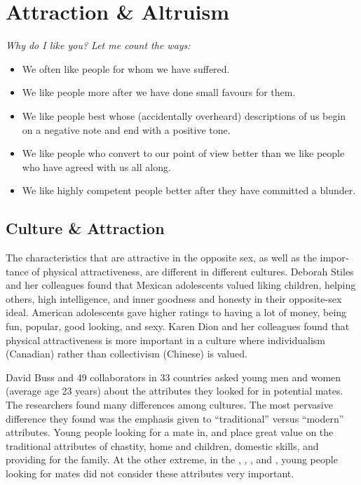 \documentclass[
]{book}
\providecommand{\tightlist}{%
  \setlength{\itemsep}{0pt}\setlength{\parskip}{0pt}}
\begin{document}
\hypertarget{attraction-altruism}{%
\section{Attraction \& Altruism}\label{attraction-altruism}}

\emph{Why do I like you? Let me count the ways:}

\begin{itemize}
\tightlist
\item
  We often like people for whom we have suffered.\\
\item
  We like people more after we have done small favours for them.\\
\item
  We like people best whose (accidentally over­heard) descriptions of us begin on a negative note and end with a posi­tive tone.\\
\item
  We like people who convert to our point of view better than we like people who have agreed with us all along.\\
\item
  We like highly competent people better after they have committed a blunder.
\end{itemize}

\hypertarget{culture-attraction}{%
\subsection*{Culture \& Attraction}\label{culture-attraction}}

The characteristics that are attractive in the opposite sex, as well as the impor­tance of physical attractiveness, are different in different cultures. Deborah Stiles and her colleagues found that Mexican adolescents valued liking children, helping others, high intelligence, and inner goodness and honesty in their oppo­site-sex ideal. American adolescents gave higher ratings to having a lot of money, being fun, popular, good looking, and sexy. Karen Dion and her colleagues found that physical attractiveness is more impor­tant in a culture where individualism (Canadian) rather than collectivism (Chinese) is valued.

David Buss and 49 collaborators in 33 countries asked young men and women (average age 23 years) about the attributes they looked for in potential mates. The researchers found many differences among cultures. The most pervasive difference they found was the emphasis given to ``traditional'' versus ``modern'' attributes. Young people looking for a mate in, and place great value on the traditional attributes of chastity, home and children, domestic skills, and providing for the family. At the other extreme, in the , , , and , young people looking for mates did not consider these attributes very important.
\end{document}
